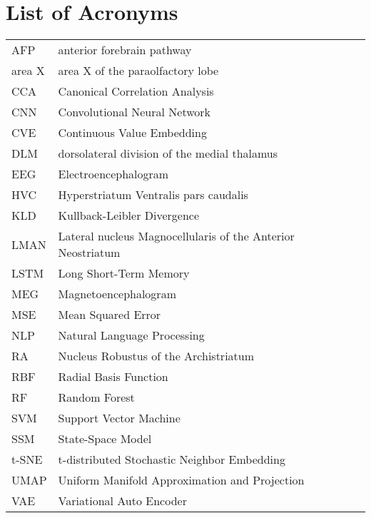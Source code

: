 
\chapter*{List of Acronyms}


\begin{tabular}{lp{12.5cm}}\\
AFP & anterior forebrain pathway\\
area X & area X of the paraolfactory lobe\\
CCA & Canonical Correlation Analysis\\
CNN & Convolutional Neural Network\\
CVE & Continuous Value Embedding\\
DLM & dorsolateral division of the medial thalamus\\
EEG & Electroencephalogram\\
HVC & Hyperstriatum Ventralis pars caudalis\\
KLD & Kullback-Leibler Divergence\\
LMAN & Lateral nucleus Magnocellularis of the Anterior Neostriatum\\
LSTM & Long Short-Term Memory\\
MEG & Magnetoencephalogram\\
MSE & Mean Squared Error\\
NLP & Natural Language Processing\\
RA & Nucleus Robustus of the Archistriatum\\
RBF & Radial Basis Function\\
RF & Random Forest\\
SVM & Support Vector Machine\\
SSM & State-Space Model\\
t-SNE & t-distributed Stochastic Neighbor Embedding\\
UMAP & Uniform Manifold Approximation and Projection\\
VAE & Variational Auto Encoder \\
\end{tabular}
